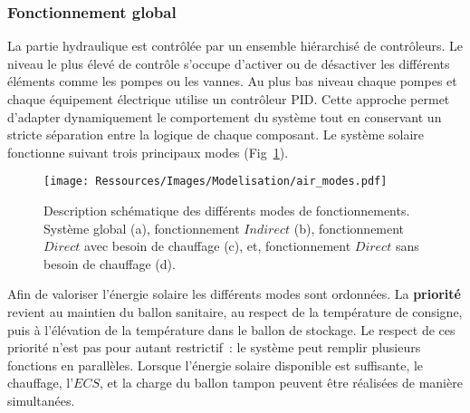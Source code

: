 \subsubsection{Fonctionnement global} %
\label{ssub:fonctionnement_global}
La partie hydraulique est contrôlée par un ensemble hiérarchisé de contrôleurs. Le niveau
le plus élevé de contrôle s’occupe d’activer ou de désactiver les différents éléments
comme les pompes ou les vannes. Au plus bas niveau chaque pompes et chaque équipement
électrique utilise un contrôleur PID. Cette approche permet d’adapter dynamiquement le
comportement du système tout en conservant un stricte séparation entre la logique de
chaque composant. Le système solaire fonctionne suivant trois principaux modes
(Fig~\ref{fig:schema_modes}).
\begin{figure}
    \begin{center}
        \texttt{[image: Ressources/Images/Modelisation/air\_modes.pdf]}
    \end{center}
    \caption{Description schématique des différents modes de fonctionnements. Système
    global (a), fonctionnement $Indirect$ (b), fonctionnement $Direct$ avec besoin de
    chauffage (c), et, fonctionnement $Direct$ sans besoin de chauffage (d).
             \label{fig:schema_modes}}
\end{figure}

Afin de valoriser l’énergie solaire les différents modes sont ordonnées. La \textbf{priorité} revient au maintien du ballon
sanitaire, au respect de la température de consigne, puis à l’élévation de la température
dans le ballon de stockage. Le respect de ces priorité n’est pas pour autant restrictif~:
le système peut remplir plusieurs fonctions en parallèles. Lorsque l’énergie solaire
disponible est suffisante, le chauffage, l’$ECS$, et la charge du ballon tampon
peuvent être réalisées de manière simultanées.

